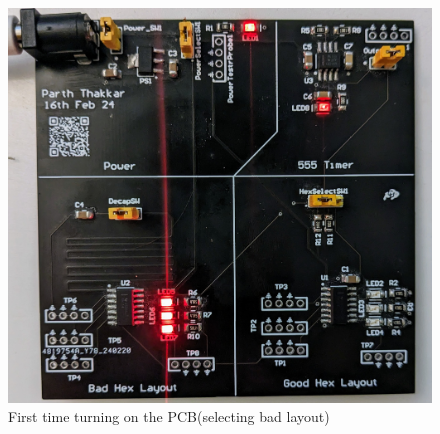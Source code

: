 \documentclass[a4paper,11pt]{article}%
\begin{document}
\begin{figure}[H]
	\centering
	\includegraphics[scale=0.1]{figures/badpcb.jpg}
	\caption{First time turning on the PCB(selecting bad layout)}
\end{figure}
\end{document}
